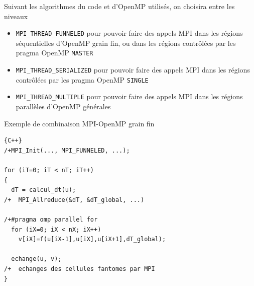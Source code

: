 \documentclass{beamer}
\begin{document}
\begin{frame}
	
	Suivant les algorithmes du code et d'OpenMP utilisés, on choisira entre les niveaux 
\vfill
	
	\begin{itemize}
		\item \texttt{MPI\_THREAD\_FUNNELED} pour pouvoir faire des appels MPI dans les régions séquentielles d'OpenMP grain fin, ou dans les régions contrôlées par les pragma OpenMP \texttt{MASTER}
		
\vfill
		\item \texttt{MPI\_THREAD\_SERIALIZED} pour pouvoir faire des appels MPI dans les régions contrôlées par les pragma OpenMP \texttt{SINGLE}
		
\vfill
		\item \texttt{MPI\_THREAD\_MULTIPLE} pour pouvoir faire des appels MPI dans les régions parallèles d'OpenMP générales
	\end{itemize}
\vfill

\end{frame}

\begin{frame}[fragile]
	Exemple de combinaison MPI-OpenMP grain fin
	

\begin{lstlisting}{C++}
/+MPI_Init(..., MPI_FUNNELED, ...);
	
for (iT=0; iT < nT; iT++)
{
  dT = calcul_dt(u);
/+  MPI_Allreduce(&dT, &dT_global, ...)
  
/+#pragma omp parallel for
  for (iX=0; iX < nX; iX++)
	v[iX]=f(u[iX-1],u[iX],u[iX+1],dT_global);
	
  echange(u, v);
/+  echanges des cellules fantomes par MPI  
}
	\end{lstlisting}
	
\end{frame}
\end{document}
